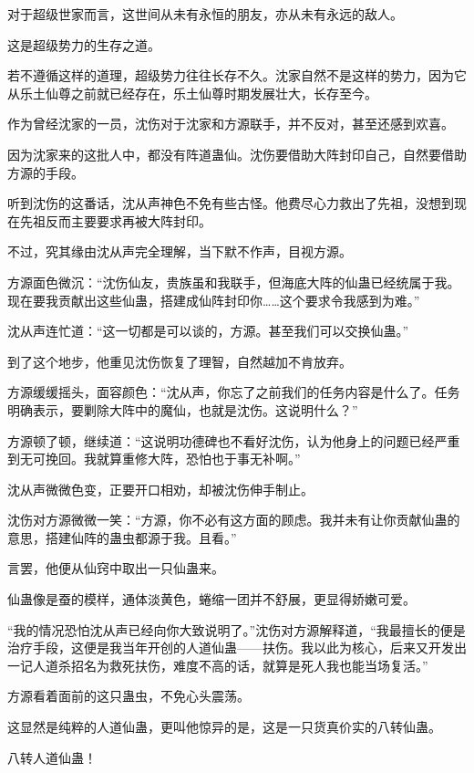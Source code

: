 
\begin{this_body}

对于超级世家而言，这世间从未有永恒的朋友，亦从未有永远的敌人。

这是超级势力的生存之道。

若不遵循这样的道理，超级势力往往长存不久。沈家自然不是这样的势力，因为它从乐土仙尊之前就已经存在，乐土仙尊时期发展壮大，长存至今。

作为曾经沈家的一员，沈伤对于沈家和方源联手，并不反对，甚至还感到欢喜。

因为沈家来的这批人中，都没有阵道蛊仙。沈伤要借助大阵封印自己，自然要借助方源的手段。

听到沈伤的这番话，沈从声神色不免有些古怪。他费尽心力救出了先祖，没想到现在先祖反而主要要求再被大阵封印。

不过，究其缘由沈从声完全理解，当下默不作声，目视方源。

方源面色微沉：“沈伤仙友，贵族虽和我联手，但海底大阵的仙蛊已经统属于我。现在要我贡献出这些仙蛊，搭建成仙阵封印你……这个要求令我感到为难。”

沈从声连忙道：“这一切都是可以谈的，方源。甚至我们可以交换仙蛊。”

到了这个地步，他重见沈伤恢复了理智，自然越加不肯放弃。

方源缓缓摇头，面容颜色：“沈从声，你忘了之前我们的任务内容是什么了。任务明确表示，要剿除大阵中的魔仙，也就是沈伤。这说明什么？”

方源顿了顿，继续道：“这说明功德碑也不看好沈伤，认为他身上的问题已经严重到无可挽回。我就算重修大阵，恐怕也于事无补啊。”

沈从声微微色变，正要开口相劝，却被沈伤伸手制止。

沈伤对方源微微一笑：“方源，你不必有这方面的顾虑。我并未有让你贡献仙蛊的意思，搭建仙阵的蛊虫都源于我。且看。”

言罢，他便从仙窍中取出一只仙蛊来。

仙蛊像是蚕的模样，通体淡黄色，蜷缩一团并不舒展，更显得娇嫩可爱。

“我的情况恐怕沈从声已经向你大致说明了。”沈伤对方源解释道，“我最擅长的便是治疗手段，这便是我当年开创的人道仙蛊——扶伤。我以此为核心，后来又开发出一记人道杀招名为救死扶伤，难度不高的话，就算是死人我也能当场复活。”

方源看着面前的这只蛊虫，不免心头震荡。

这显然是纯粹的人道仙蛊，更叫他惊异的是，这是一只货真价实的八转仙蛊。

八转人道仙蛊！


\end{this_body}
